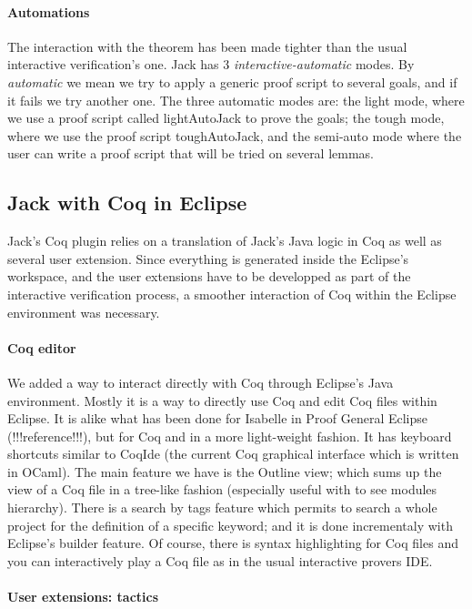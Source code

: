 \paragraph{Automations}
The interaction with the theorem has been made tighter than the usual 
interactive verification's one.
Jack has 3 {\it interactive-automatic} modes. 
By {\it automatic} we mean we 
try to apply a generic proof script to several goals, 
and if it fails we try another one. 
The three automatic modes are: the light mode, where we use a proof script
called lightAutoJack to prove the goals; 
the tough mode, where we use the proof script toughAutoJack, 
and the semi-auto mode where the user can write a proof script that will
be tried on several lemmas.



\subsection{Jack with Coq in Eclipse}
Jack's Coq plugin relies on a translation of Jack's Java logic in
Coq as well as several user extension. Since everything is generated
inside the Eclipse's workspace, and the user extensions have to be 
developped as part of the interactive verification process,
 a smoother interaction of Coq within
the Eclipse environment was necessary.

\paragraph{Coq editor}
We added a way to interact directly with Coq through Eclipse's Java 
environment. Mostly it is a way to directly use Coq and edit Coq files within
Eclipse. It is alike what has been done for Isabelle in Proof General Eclipse 
(!!!reference!!!), but for Coq and in a more light-weight fashion.
It has keyboard shortcuts similar to CoqIde (the current Coq graphical
interface which is written in OCaml). 
The main feature we have is the Outline view; 
which sums up the view of a Coq file in a tree-like fashion (especially useful
with to see modules hierarchy). There is a search by tags feature which
permits to search a whole project for the definition of a specific keyword; and
it is done incrementaly with Eclipse's builder feature. Of course, there is 
syntax highlighting for Coq files and you can interactively play a Coq file
as in the usual interactive provers IDE.


\paragraph{User extensions: tactics}

